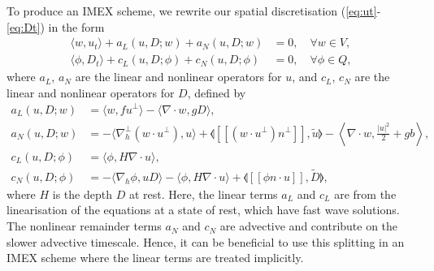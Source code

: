 \documentclass[a4paper, 12pt]{article}
\newcommand{\revisedus}[1]{#1}
\newcommand{\jump}[1]{[\![#1]\!]}
\begin{document}
To produce an IMEX scheme, we rewrite our spatial discretisation
(\ref{eq:ut}-\ref{eq:Dt}) in the form
\begin{align}
  \label{eq:ut IMEX}
  \langle w, u_t \rangle + a_L(u,D;w) 
  + a_N(u,D;w) 
   & = 0,
  \quad \forall w \in V, \\
  \label{eq:Dt IMEX}
  \langle \phi, D_t \rangle
+ c_L(u,D; \phi) + c_N(u,D; \phi)  & =
 0, \quad \forall \phi \in Q,
\end{align}
where $a_L$, $a_N$ are the linear and nonlinear operators for $u$,
and $c_L$, $c_N$ are the linear and nonlinear operators for $D$,
defined by
\begin{align}
  a_L(u,D;w) & = \langle w, fu^\perp \rangle - \langle \nabla\cdot w,
  gD \rangle, \\
   a_N(u,D;w) 
&=
  - \langle \nabla_h^\perp (w\cdot u^\perp), u \rangle
  + \llangle \jump{(w\cdot u^\perp) n^\perp}, \tilde{u} \rrangle  - \left\langle \nabla\cdot w, \frac{|u|^2}{2} + gb \right\rangle, \\
  c_L(u,D;\phi) & = \langle \phi, H\nabla\cdot u\rangle, \\
  \revisedus{c_N}(u,D; \phi) &=
  - \langle \nabla_h \phi, uD \rangle
  - \langle \phi, H\nabla\cdot u\rangle
  + \llangle \jump{\phi n\cdot u}, \tilde{D} \rrangle,
\end{align}
where $H$ is the depth $D$ at rest. Here, the linear terms $a_L$ and
$c_L$ are from the linearisation of the equations at a state of rest,
which have fast wave solutions.  The nonlinear remainder terms $a_N$
and $c_N$ are advective and contribute on the slower advective
timescale. Hence, it can be beneficial to use this splitting in an
IMEX scheme where the linear terms are treated implicitly.
\end{document}
